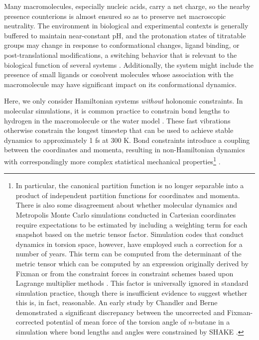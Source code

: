 Many macromolecules, especially nucleic acids, carry a net charge, so the nearby presence counterions is almost ensured so as to preserve net macroscopic neutrality.
The environment in biological and experimental contexts is generally buffered to maintain near-constant pH, and the protonation states of titratable groups may change in response to conformational changes, ligand binding, or post-translational modifications, a switching behavior that is relevant to the biological function of several systems \cite{srivastava:2006a}.
Additionally, the system might include the presence of small ligands or cosolvent molecules whose association with the macromolecule may have significant impact on its conformational dynamics.

Here, we only consider Hamiltonian systems \emph{without} holonomic constraints.
In molecular simulations, it is common practice to constrain bond lengths to hydrogen in the macromolecule \cite{SHAKE,RATTLE} or the water model \cite{jorgensen:1983a}.
These fast vibrations otherwise constrain the longest timestep that can be used to achieve stable dynamics to approximately 1 fs at 300 K.
Bond constraints introduce a coupling between the coordinates and momenta, resulting in non-Hamiltonian dynamics with correspondingly more complex statistical mechanical properties\footnote{In particular, the canonical partition function is no longer separable into a product of independent partition functions for coordinates and momenta.  There is also some disagreement about whether molecular dynamics and Metropolis Monte Carlo simulations conducted in Cartesian coordinates require expectations to be estimated by including a weighting term for each snapshot based on the metric tensor factor.  Simulation codes that conduct dynamics in torsion space, however, have employed such a correction for a number of years.  This term can be computed from the determinant of the metric tensor which can be computed by an expression originally derived by Fixman \cite{fixman:1974a} or from the constraint forces in constraint schemes based upon Lagrange multiplier methods \cite{tuckerman:1992a}.  This factor is universally ignored in standard simulation practice, though there is insufficient evidence to suggest whether this is, in fact, reasonable. An early study by Chandler and Berne  demonstrated a significant discrepancy between the uncorrected and Fixman-corrected potential of mean force of the torsion angle of $n$-butane in a simulation where bond lengths and angles were constrained by SHAKE \cite{chandler:jcp:1979}.} \cite{fixman:1974a,tuckerman:2001a,hartmann:2004b}.
